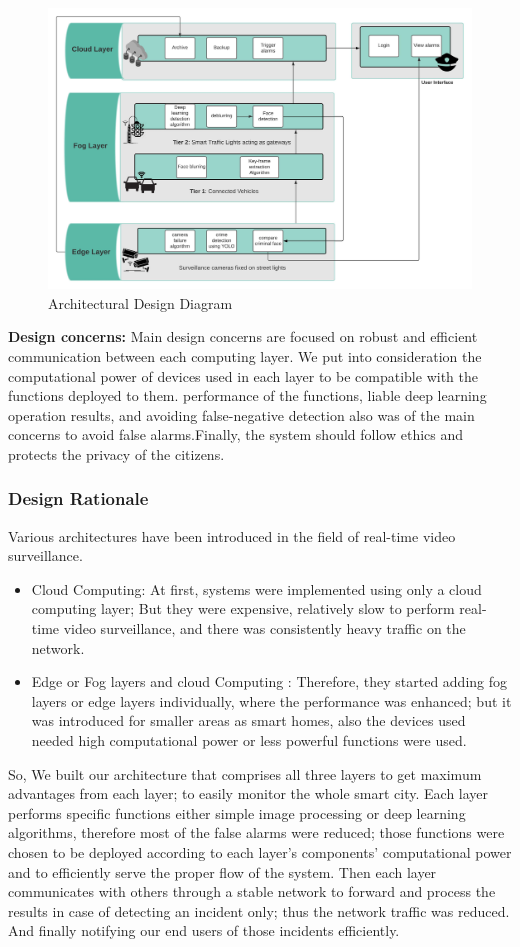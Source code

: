 \documentclass[12pt]{article}
\begin{document}
\begin{figure}[htbp]
\centering
\includegraphics[width=0.9\linewidth]{arch.jpeg}
\caption{Architectural Design Diagram }
\label{archdsgn}
\end{figure}
\FloatBarrier
\textbf{Design concerns:}
Main design concerns are focused on robust and efficient communication between each computing layer. We put into consideration the computational power of devices used in each layer to be compatible with the functions deployed to them. performance of the functions, liable deep learning operation results, and avoiding false-negative detection also was of the main concerns to avoid false alarms.Finally, the system should follow ethics and protects the privacy of the citizens.

\subsubsection{Design Rationale}
Various architectures have been introduced in the field of real-time video surveillance.
\begin{itemize}
\item Cloud Computing: At first, systems were implemented using only a cloud computing layer; But they were expensive, relatively slow to perform real-time video surveillance, and there was consistently heavy traffic on the network. 
\item Edge or Fog layers and cloud Computing : Therefore, they started adding fog layers or edge layers individually, where the performance was enhanced; but it was introduced for smaller areas as smart homes, also the devices used needed high computational power or less powerful functions were used.
\end{itemize}
\newline  So, We built our architecture that comprises all three layers to get maximum advantages from each layer; to easily monitor the whole smart city. Each layer performs specific functions either simple image processing or deep learning algorithms, therefore most of the false alarms were reduced; those functions were chosen to be deployed according to each layer's components' computational power and to efficiently serve the proper flow of the system. Then each layer communicates with others through a stable network to forward and process the results in case of detecting an incident only; thus the network traffic was reduced. And finally notifying our end users of those incidents efficiently.
\FloatBarrier
\end{document}
